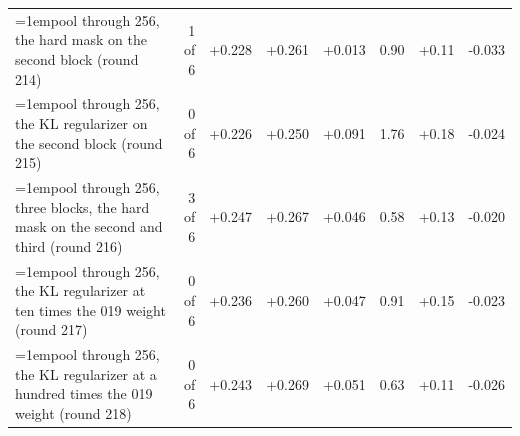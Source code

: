 \begin{table}[H]
\begin{tabular}{@{}>{\raggedright\hangindent=1em\hangafter=1\arraybackslash}p{71.2mm}rrrrrrr@{}}
    pool through 256, the hard mask on the second block (round 214) & 1 of 6 & +0.228 & +0.261 & +0.013 & 0.90 & +0.11 & -0.033 \\
    pool through 256, the KL regularizer on the second block (round 215) & 0 of 6 & +0.226 & +0.250 & +0.091 & 1.76 & +0.18 & -0.024 \\
    pool through 256, three blocks, the hard mask on the second and third (round 216) & 3 of 6 & +0.247 & +0.267 & +0.046 & 0.58 & +0.13 & -0.020 \\
    pool through 256, the KL regularizer at ten times the 019 weight (round 217) & 0 of 6 & +0.236 & +0.260 & +0.047 & 0.91 & +0.15 & -0.023 \\
    pool through 256, the KL regularizer at a hundred times the 019 weight (round 218) & 0 of 6 & +0.243 & +0.269 & +0.051 & 0.63 & +0.11 & -0.026 \\
    \hline
  \end{tabular}
\end{table}

